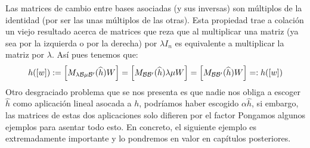 Las matrices de cambio entre bases asociadas (y sus inversas) son múltiplos de la identidad (por ser las unas múltiplos de las otras). Esta propiedad trae a colación un viejo resultado acerca de matrices que reza que al multiplicar una matriz (ya sea por la izquierda o por la derecha) por $\lambda I_n$ es equivalente a multiplicar la matriz por $\lambda$. Así pues tenemos que:
\begin{equation}
	h(\left [ w \right ]):=\left [ M_{\lambda \mathcal{B}\mu\mathcal{B}'}(\widehat{h})W \right ]=\left [ M_{\mathcal{B}\mathcal{B}'}(\widehat{h})\lambda\mu W \right ]=\left [ M_{\mathcal{B}\mathcal{B}'}(\widehat{h})W \right ]=:h(\left [ w \right ])
\end{equation}
Otro desgraciado problema que se nos presenta es que nadie nos obliga a escoger $\widehat{h}$ como aplicación lineal asocada a $h$, podríamos haber escogido $\alpha\widehat{h}$, si embargo, las matrices de estas dos aplicaciones solo difieren por el factor
Pongamos algunos ejemplos para asentar todo esto. En concreto, el siguiente ejemplo es extremadamente importante y lo pondremos en valor en capítulos posteriores.
